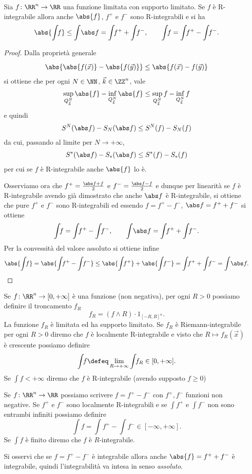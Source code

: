 \begin{theorem}
Sia $f\colon \RR^n \to \RR$ una funzione limitata con supporto limitato.
Se $f$ è R-integrabile allora anche $\abs{f}$, $f^+$ e $f^-$ sono 
R-integrabili e si ha 
\[
  \abs{\int\!\! f} \le \int\! \abs f = \int\!\! f^+ + \int\!\! f^-, 
  \qquad 
 \int\!\! f = \int\!\! f^+ - \int\!\! f^-.
\]
\end{theorem}
\begin{proof}
Dalla proprietà generale 
\[
  \abs{\rule{0pt}{1.1em}\abs{f(\vec x)} - \abs{f(\vec y)}} \le \abs{f(\vec x) - f(\vec y)}
\]
si ottiene che per ogni $N\in \NN$, $\vec k \in \ZZ^n$, vale
\[
  \sup_{Q^N_{\vec k}} \abs{f} - \inf_{Q^N_{\vec k}} \abs{f}
  \le 
  \sup_{Q^N_{\vec k}} f - \inf_{Q^N_{\vec k}} f
\]
e quindi 
\[
   S^N(\abs f) - S_N(\abs f) \le S^N(f) - S_N(f)
\] 
da cui, passando al limite per $N\to +\infty$,
\[
  S^*(\abs f) - S_*(\abs f) \le S^*(f) - S_*(f)
\]
per cui se $f$ è R-integrabile anche $\abs{f}$ lo è.

Osserviamo ora che $f^+=\frac{\abs f + f}{2}$ e $f^-=\frac{\abs f - f}{2}$ 
e dunque per linearità se $f$ è R-integrabile avendo già dimostrato 
che anche $\abs f$ è R-integrabile, si ottiene che pure $f^+
$ e $f^-$ sono R-integrabili ed essendo $f=f^+-f^-$, $\abs f = f^+ + f^-$ si ottiene 
\[
  \int\!\! f = \int\!\! f^+ - \int\!\! f^-, \qquad 
  \int\! \abs f = \int\!\! f^+ + \int\!\! f^-.
\]
Per la convessità del valore assoluto si ottiene infine
\[
 \abs{\int\!\! f} = \abs{\int\!\! f^+ - \int\!\! f^-} 
 \le \abs {\int\!\! f^+} + \abs{\int\!\! f^-}
 = \int\!\! f^+ + \int\!\! f^- = \int\! \abs f.
\]
\end{proof}

\begin{definition}
Se $f\colon \RR^n \to [0,+\infty]$ è una funzione (non negativa), per ogni $R>0$ 
possiamo definire il troncamento $f_R$ 
\[
  f_R = (f \wedge R) \cdot 1_{[-R,R]^n}.
\]
La funzione $f_R$ è limitata ed ha supporto limitato.
Se $f_R$ è Riemann-integrabile per ogni $R>0$ diremo che $f$ è localmente R-integrabile 
e visto che $R\mapsto f_R(\vec x)$ è crescente possiamo definire
\[
 \int\!\! f \defeq \lim_{R\to+\infty} \int\!\! f_R \in [0,+\infty].
\]
Se $\int\!\! f<+\infty$ diremo che $f$ è R-integrabile (avendo supposto $f\ge 0$)

Se $f\colon \RR^n\to \RR$ possiamo scrivere $f= f^+-f^-$ con $f^+,f^-$ funzioni non negative.
Se $f^+$ e $f^-$ sono localmente R-integrabili e se 
$\int\!\! f^+$ e $\int\!\! f^-$ non sono entrambi infiniti possiamo definire 
\[
  \int\!\! f = \int\!\! f^+ - \int\!\! f^- \in [-\infty,+\infty].
\]
Se $\int\!\! f$ è finito diremo che $f$ è $R$-integrabile.

Si osservi che se $f=f^+ - f^-$ è integrabile allora anche 
$\abs{f} = f^+ + f^-$ è integrabile, quindi l'integrabilità va intesa 
in senso \emph{assoluto}.
\end{definition}

